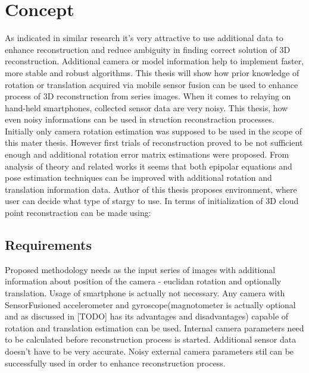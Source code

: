 
\chapter{Concept} %
As indicated in similar research it's very attractive to use additional data to enhance reconstruction and reduce ambiguity in finding correct solution of 3D reconstruction. Additional camera or model information help to implement faster, more stable and robust algorithms. This thesis will show how prior knowledge of rotation or translation acquired via mobile sensor fusion can be used to enhance process of 3D reconstruction from series images. When it comes to relaying on hand-held smartphones, collected sensor data are very noisy. This thesis, how even noisy informations can be used in struction reconstraction processes. Initially only camera rotation estimation was supposed to be used in the scope of this mater thesis. However first trials of reconstruction proved to be not sufficient enough and additional rotation error matrix estimations were proposed.
From analysis of theory and related works it seems that both epipolar equations and pose estimation techniques can be improved with additional rotation and translation information data.  Author of this thesis proposes environment, where user can decide what type of stargy to use. In terms of initialization of 3D cloud point reconstraction can be made using: 

\section{Requirements}
Proposed methodology needs as the input series of images with additional information about position of the camera - euclidan rotation and optionally translation. Usage of smartphone is actually not necessary. Any camera with SensorFusioned accelerometer and gyroscope(magnotometer is actually optional and as discussed in [TODO] has its advantages and disadvantages) capable of rotation and translation estimation can be used. Internal camera parameters need to be calculated before reconstruction process is started. Additional sensor data doesn't have to be very accurate. Noisy external camera parameters stil can be successfully used in order to enhance reconstruction process.
